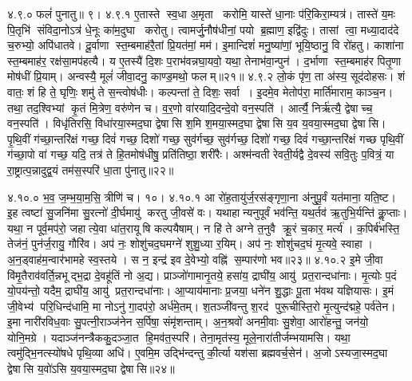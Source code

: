 ४.९.०
फलं॑ पुनातु॥ ९।
४.९.१
ए॒तास्ते स्व॒धा अ॒मृता करोमि॒ यास्ते॑ धा॒नाः प॑रि॒किरा॒म्यत्र॑। तास्ते॑ य॒मः पि॒तृभि॑ संविदा॒नोऽत्र॑ धे॒नूः का॑म॒दुघा करोतु। त्वामर्जु॒नौष॑धीनां॒ पयो ब्र॒ह्माण॒ इद्वि॑दुः। तासां त्वा॒ मध्या॒दाद॑दे च॒रुभ्यो॒ अपि॑धातवे। दू॒र्वाणा स्त॒म्बमाह॑रै॒तां प्रि॒यत॑मां॒ मम॑। इ॒मान्दिशं॑ मनु॒ष्या॑णां॒ भूयि॒ष्ठानु॒ वि रो॑हतु। काशा॑ना स्त॒म्बमाह॑र॒ रक्ष॑सा॒मप॑हत्यै। य ए॒तस्यै॑ दि॒शः प॒राभ॑वन्नघा॒यवो॒ यथा॒ तेनाभ॑वा॒न्पुन॑। द॒र्भाणा स्त॒म्बमाह॑र पितृ॒णा मोष॑धीं प्रि॒याम्। अन्वस्यै॒ मूलं॑ जीवा॒दनु॒ काण्ड॒मथो॒ फलम्॥२१॥
४.९.२
लो॒कं पृ॑ण॒ ता अ॑स्य॒ सूद॑दोहसः। शं वातः॒ शं हि ते॒ घृणिः॒ शमु॑ ते स॒न्त्वोष॑धीः। कल्पन्तां ते॒ दिशः॒ सर्वा। इ॒दमे॒व मेतोप॑रा॒ मार्ति॑माराम॒ काञ्च॒न। तथा॒ तद॒श्विभ्यां कृ॒तं मि॒त्रेण॒ वरु॑णेन च। व॒र॒णो वा॑रयादि॒दन्दे॒वो वन॒स्पति॑। आर्त्यै॒ निर्\mbox{}ऋ॑त्यै॒ द्वेषाच्च॒ वन॒स्पति॑। विधृ॑तिरसि॒ विधा॑रया॒स्मद॒घा द्वेषासि श॒मि श॒मया॒स्मद॒घा द्वेषासि य॒व य॒वया॒स्मद॒घा द्वेषासि। पृ॒थि॒वीं ग॑च्छा॒न्तरि॑क्षं गच्छ॒ दिवं॑ गच्छ॒ दिशो॑ गच्छ॒ सुव॑र्गच्छ॒ सुव॑र्गच्छ॒ दिशो॑ गच्छ॒ दिवं॑ गच्छा॒न्तरि॑क्षं गच्छ पृथि॒वीं ग॑च्छा॒पो वा॑ गच्छ॒ यदि॒ तत्र॑ ते हि॒तमोष॑धीषु॒ प्रति॑तिष्ठा॒ शरी॑रैः। अश्म॑न्वती रेवती॒र्यद्वै दे॒वस्य॑ सवि॒तुः प॒वित्रं॒ या रा॒ष्ट्रात्प॒न्नादुद्व॒यं तम॑स॒स्परि॑ धा॒ता पु॑नातु॥२२॥
\anuvakamend

४.१०.०
भ॒व॒ ज॒म्भ॒या॒म॒सि॒ त्रीणि॑ च। १०।
४.१०.१
आ रो॑ह॒तायु॑र्ज॒रस॑ङ्गृणा॒ना अ॑नुपू॒र्वं यत॑माना॒ यति॒ष्ट। इ॒ह त्वष्टा॑ सु॒जनि॑मा सु॒रत्नो॑ दी॒र्घमायु॑ करतु जी॒वसे॑ वः। यथाहान्यनुपूर्वं भव॑न्ति॒ यथ॒र्तव॑ ऋ॒तुभि॒र्यन्ति॑ कॢ॒प्ताः। यथा॒ न पूर्व॒मप॑रो॒ जहात्ये॒वा धा॑त॒रायूषि कल्पयैषाम्। न हि॑ ते अग्ने त॒नुवै क्रू॒रं च॒कार॒ मर्त्य॑। क॒पिर्ब॑भस्ति॒ तेज॑नं॒ पुन॑र्ज॒रायु॒ गौरि॑व। अप॑ नः॒ शोशु॑चद॒घमग्ने॑ शुशु॒ध्या र॒यिम्। अप॑ नः॒ शोशु॑चद॒घं मृ॒त्यवे॒ स्वाहा। अ॒न॒ड्वाह॑म॒न्वार॑भामहे स्व॒स्तये। स न॒ इन्द्र॑ इव दे॒वेभ्यो॒ वह्नि॑ स॒म्पार॑णो भव॥२३॥
४.१०.२
इ॒मे जी॒वा वि॑मृ॒तैराव॑वर्ति॒न्नभूद्भ॒द्रा दे॒वहू॑तिं नो अ॒द्य। प्राञ्जो॑गामानृ॒तये॒ हसा॑य॒ द्राघी॑य॒ आयु॑ प्रत॒रान्दधा॑नाः। मृ॒त्योः प॒दं यो॒पय॑न्तो॒ यदैम॒ द्राघी॑य॒ आयु॑ प्रत॒रान्दधा॑नाः। आ॒प्याय॑मानाः प्र॒जया॒ धने॑न शु॒द्धाः पू॒ता भ॑वथ यज्ञियासः। इ॒मं जी॒वेभ्य॑ परि॒धिन्द॑धामि॒ मा नोऽनु॑ गा॒दप॑रो॒ अर्ध॑मे॒तम्। श॒तञ्जी॑वन्तु श॒रद॑ पुरू॒चीस्ति॒रो मृ॒त्युन्द॑द्महे॒ पर्व॑तेन। इ॒मा नारी॑रविध॒वाः सु॒पत्नी॒राञ्ज॑नेन स॒र्पिषा॒ संमृ॑शन्ताम्। अ॒न॒श्रवो॑ अनमी॒वाः सु॒शेवा॒ आरो॑हन्तु॒ जन॑यो॒ योनि॒मग्रे। यदाञ्ज॑नन्त्रैककु॒दञ्जा॒त हि॒मव॑त॒स्परि॑। तेना॒मृत॑स्य॒ मूले॒नारा॑तीर्जम्भयामसि। यथा॒ त्वमु॑द्भि॒नत्स्यो॑षधे पृथि॒व्या अधि॑। ए॒वमि॒म उद्भि॑न्दन्तु की॒र्त्या यश॑सा ब्रह्मवर्च॒सेन॑। अ॒जोऽस्यजा॒स्मद॒घा द्वेषासि य॒वो॑ऽसि य॒वया॒स्मद॒घा द्वेषासि॥२४॥
\anuvakamend

